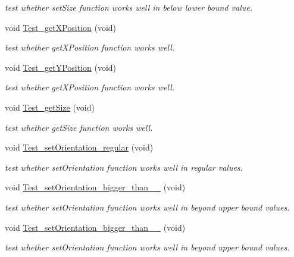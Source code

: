 \begin{DoxyCompactItemize}
\begin{DoxyCompactList}\small\item\em test whether set\-Size function works well in below lower bound value. \end{DoxyCompactList}\item 
void \hyperlink{classObjectTests_af81ace2398dad8139a6c1d25de79de0d}{Test\-\_\-get\-X\-Position} (void)
\begin{DoxyCompactList}\small\item\em test whether get\-X\-Position function works well. \end{DoxyCompactList}\item 
void \hyperlink{classObjectTests_a881750d276c37304b1e28855ec7efd89}{Test\-\_\-get\-Y\-Position} (void)
\begin{DoxyCompactList}\small\item\em test whether get\-X\-Position function works well. \end{DoxyCompactList}\item 
void \hyperlink{classObjectTests_aeb1525bf71b652c62bec9efb0a207683}{Test\-\_\-get\-Size} (void)
\begin{DoxyCompactList}\small\item\em test whether get\-Size function works well. \end{DoxyCompactList}\item 
void \hyperlink{classObjectTests_aa990ea69bf041eb56b9f5eaf77147dd7}{Test\-\_\-set\-Orientation\-\_\-regular} (void)
\begin{DoxyCompactList}\small\item\em test whether set\-Orientation function works well in regular values. \end{DoxyCompactList}\item 
void \hyperlink{classObjectTests_a41f09e4861c008db7a8ccbc269c2e709}{Test\-\_\-set\-Orientation\-\_\-bigger\-\_\-than\-\_\-\_} (void)
\begin{DoxyCompactList}\small\item\em test whether set\-Orientation function works well in beyond upper bound values. \end{DoxyCompactList}\item 
void \hyperlink{classObjectTests_a847dd35383f5542c3d7c96e758bc4898}{Test\-\_\-set\-Orientation\-\_\-bigger\-\_\-than\-\_\-\_} (void)
\begin{DoxyCompactList}\small\item\em test whether set\-Orientation function works well in beyond upper bound values. \end{DoxyCompactList}\item 

\end{DoxyCompactItemize}
